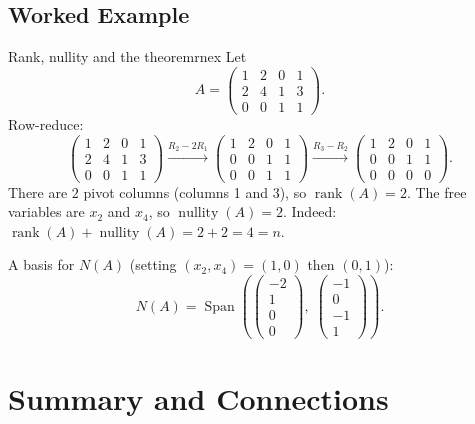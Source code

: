 \documentclass[12pt,a4paper]{article}
\DeclareMathOperator{\Span}{Span}
\DeclareMathOperator{\rank}{rank}
\DeclareMathOperator{\nullity}{nullity}
\begin{document}
		\subsection{Worked Example}
		
		\begin{example}{Rank, nullity and the theorem}{rnex}
			Let
			\[
			A = \begin{pmatrix}
				1 & 2 & 0 & 1 \\
				2 & 4 & 1 & 3 \\
				0 & 0 & 1 & 1
			\end{pmatrix}.
			\]
			Row-reduce:
			\[
			\begin{pmatrix}
				1&2&0&1\\2&4&1&3\\0&0&1&1
			\end{pmatrix}
			\xrightarrow{R_2 - 2R_1}
			\begin{pmatrix}
				1&2&0&1\\0&0&1&1\\0&0&1&1
			\end{pmatrix}
			\xrightarrow{R_3 - R_2}
			\begin{pmatrix}
				1&2&0&1\\0&0&1&1\\0&0&0&0
			\end{pmatrix}.
			\]
			There are $2$ pivot columns (columns 1 and 3), so $\rank(A) = 2$.
			The free variables are $x_2$ and $x_4$, so $\nullity(A) = 2$.
			Indeed: $\rank(A) + \nullity(A) = 2 + 2 = 4 = n$. \checkmark
			
			A basis for $N(A)$ (setting $(x_2,x_4) = (1,0)$ then $(0,1)$):
			\[
			N(A) = \Span\!\left(
			\begin{pmatrix}-2\\1\\0\\0\end{pmatrix},\;
			\begin{pmatrix}-1\\0\\-1\\1\end{pmatrix}
			\right).
			\]
		\end{example}
		
		\section{Summary and Connections}
		
\end{document}
